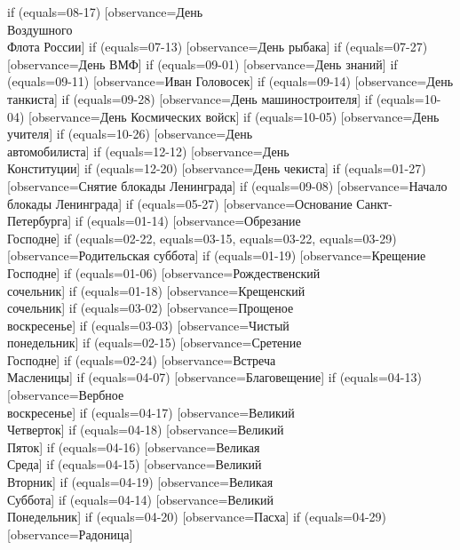 {  if (equals=08-17) [observance=День\\ Воздушного\\ Флота России]
  if (equals=07-13) [observance=День рыбака]
  if (equals=07-27) [observance=День ВМФ]
  if (equals=09-01) [observance=День знаний]
  if (equals=09-11) [observance=Иван Головосек]
  if (equals=09-14) [observance=День танкиста]
  if (equals=09-28) [observance=День машино\-строителя]
  if (equals=10-04) [observance=День Космических войск]
  if (equals=10-05) [observance=День учителя]
  if (equals=10-26) [observance=День\\ автомобилиста]
  if (equals=12-12) [observance=День\\ Конституции]
  if (equals=12-20) [observance=День чекиста]
  if (equals=01-27) [observance=Снятие блокады Ленинграда]
  if (equals=09-08) [observance=Начало блокады Ленинграда]
  if (equals=05-27) [observance=Основание Санкт-Петербурга]
  if (equals=01-14) [observance=Обрезание\\ Господне]
  if (equals=02-22,
  	equals=03-15,
	equals=03-22,
	equals=03-29) [observance=Родительская суббота]
  if (equals=01-19) [observance=Крещение\\ Господне]
  if (equals=01-06) [observance=Рождественский\\ сочельник]
  if (equals=01-18) [observance=Крещенский\\ сочельник]
  if (equals=03-02) [observance=Прощеное\\ воскресенье]
  if (equals=03-03) [observance=Чистый\\ понедельник]
  if (equals=02-15) [observance=Сретение\\ Господне]
  if (equals=02-24) [observance=Встреча\\ Масленицы]
  if (equals=04-07) [observance=Благовещение]
  if (equals=04-13) [observance=Вербное\\ воскресенье]
  if (equals=04-17) [observance=Великий\\ Четверток]
  if (equals=04-18) [observance=Великий\\ Пяток]
  if (equals=04-16) [observance=Великая\\ Среда]
  if (equals=04-15) [observance=Великий\\ Вторник]
  if (equals=04-19) [observance=Великая\\ Суббота]
  if (equals=04-14) [observance=Великий\\ Понедельник]
  if (equals=04-20) [observance=Пасха]
  if (equals=04-29) [observance=Радоница]
}
